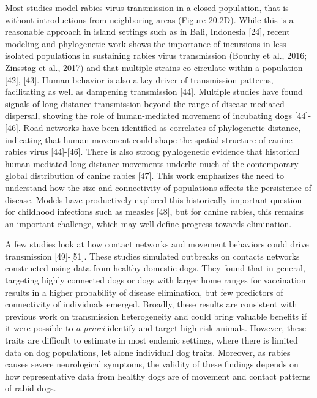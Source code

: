 \documentclass[
]{book}
\begin{document}
Most studies model rabies virus transmission in a closed population,
that is without introductions from neighboring areas (Figure 20.2D).
While this is a reasonable approach in island settings such as in Bali,
Indonesia {[}24{]}, recent modeling and phylogenetic work shows the
importance of incursions in less isolated populations in sustaining
rabies virus transmission (Bourhy et al., 2016; Zinsstag et al., 2017)
and that multiple strains co-circulate within a population {[}42{]},
{[}43{]}. Human behavior is also a key driver of transmission patterns,
facilitating as well as dampening transmission {[}44{]}. Multiple studies
have found signals of long distance transmission beyond the range of
disease-mediated dispersal, showing the role of human-mediated movement
of incubating dogs {[}44{]}-{[}46{]}. Road networks have been identified as
correlates of phylogenetic distance, indicating that human movement
could shape the spatial structure of canine rabies virus {[}44{]}-{[}46{]}.
There is also strong pyhlogenetic evidence that historical
human-mediated long-distance movements underlie much of the contemporary
global distribution of canine rabies {[}47{]}. This work emphasizes the
need to understand how the size and connectivity of populations affects
the persistence of disease. Models have productively explored this
historically important question for childhood infections such as measles
{[}48{]}, but for canine rabies, this remains an important challenge,
which may well define progress towards elimination.

A few studies look at how contact networks and movement behaviors could
drive transmission {[}49{]}-{[}51{]}. These studies simulated outbreaks on
contacts networks constructed using data from healthy domestic dogs.
They found that in general, targeting highly connected dogs or dogs with
larger home ranges for vaccination results in a higher probability of
disease elimination, but few predictors of connectivity of individuals
emerged. Broadly, these results are consistent with previous work on
transmission heterogeneity and could bring valuable benefits if it were
possible to \emph{a priori} identify and target high-risk animals. However,
these traits are difficult to estimate in most endemic settings, where
there is limited data on dog populations, let alone individual dog
traits. Moreover, as rabies causes severe neurological symptoms, the
validity of these findings depends on how representative data from
healthy dogs are of movement and contact patterns of rabid dogs.
\end{document}

